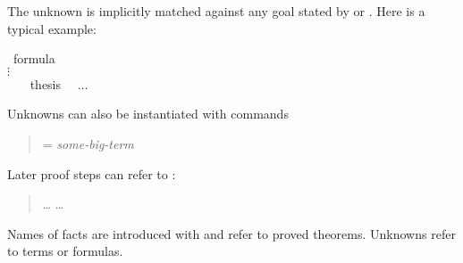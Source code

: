 \begin{isabellebody}
\begin{isamarkuptext}
The unknown  is implicitly matched against any goal stated by
 or . Here is a typical example:%
\end{isamarkuptext}%
\isamarkuptrue%
\isamarkupfalse%
\ {}formula{}\isanewline
%
\isadelimproof
%
\endisadelimproof
%
\isatagproof
{}\isamarkupfalse%
\ {}%
\\\mbox{}\quad$\vdots$\\\mbox{}\hspace{-1.4ex}
\ \ \isamarkupfalse%
\ {}thesis\ %
\ $\dots$\\
\isamarkupfalse%
%
\endisatagproof
{\isafoldproof}%
%
\isadelimproof
%
\endisadelimproof
%
\begin{isamarkuptext}%
Unknowns can also be instantiated with  commands
\begin{quote}
  = \textit{some-big-term}
\end{quote}
Later proof steps can refer to :
\begin{quote}
 \dots {} \dots{}
\end{quote}
\begin{warn}
Names of facts are introduced with  and refer to proved
theorems. Unknowns  refer to terms or formulas.
\end{warn}


\end{isamarkuptext}
\end{isabellebody}
